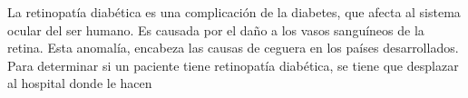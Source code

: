 
La retinopatía diabética es una complicación de la diabetes, que afecta al sistema ocular del ser humano. Es causada por el daño a los vasos sanguíneos de la retina. Esta anomalía, encabeza las causas de ceguera en los países desarrollados.
Para determinar si un paciente tiene retinopatía diabética, se tiene que  desplazar al hospital donde le hacen 